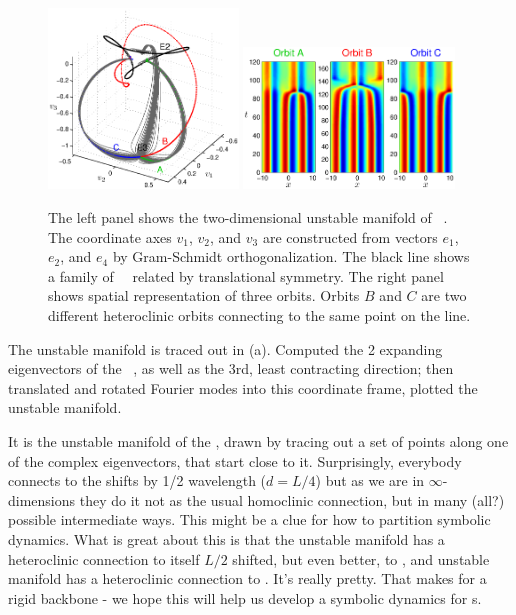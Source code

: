 \begin{figure}[t]
\begin{center}
\includegraphics[width=0.45\textwidth]{figs/ks22_E3_manifold.eps}
\includegraphics[width=0.5\textwidth]{figs/ks22_E3_orbits.eps}
\end{center}
\caption{
The left panel shows the two-dimensional
unstable manifold of \eqv\ . The coordinate axes
$v_1$, $v_2$, and $v_3$ are constructed from vectors
$e_1$, $e_2$, and $e_4$ by Gram-Schmidt orthogonalization.
The black line shows a family of ~\eqva\ related by translational
symmetry.
The right panel shows spatial representation of
three orbits. Orbits $B$ and $C$ are two different heteroclinic orbits
connecting  to the same point on the  line.
        }
\label{f:KS22E3man}
\end{figure}



The unstable manifold is traced out in
(a). Computed the 2 expanding eigenvectors
of the \eqv~, as well as the 3rd, least contracting
direction; then translated and rotated Fourier modes into this
coordinate frame, plotted the unstable manifold.

 It is the unstable manifold of the 
{\eqv}, drawn by tracing out a set of points along one of the complex
eigenvectors, that start close to it. Surprisingly, everybody connects
to the  shifts by 1/2 wavelength ($d = L/4$) but as we are in
$\infty$-dimensions they do it not as the usual homoclinic connection, but in
many (all?) possible intermediate ways. This might be a clue for how to
partition symbolic dynamics.
What is great about
this is that the  unstable manifold has a heteroclinic connection to itself
$L/2$ shifted, but
even better, to , and  unstable manifold has a heteroclinic
connection to .
It's really pretty. That makes for a rigid backbone -
we hope this will help us develop a symbolic dynamics for \rpo s.

